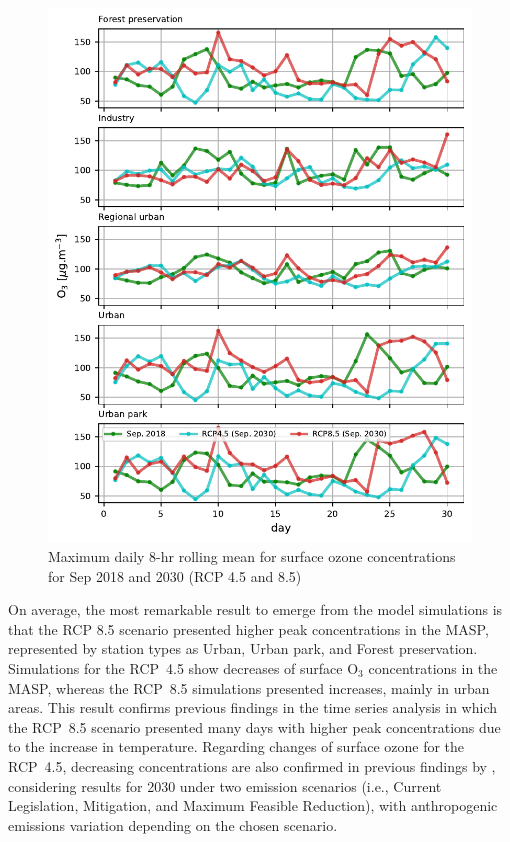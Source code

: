 \begin{figure}[!hbt]
\begin{center}
	\includegraphics{fig/MDA8_Sep_type_rcps}
\end{center}
  \caption{Maximum daily 8-hr rolling mean for surface ozone concentrations for Sep 2018 and 2030 (RCP 4.5 and 8.5)}
  \label{fig:MDA8_rcps}
\end{figure}

On average, the most remarkable result to emerge from the model simulations is that the RCP 8.5 scenario presented higher peak concentrations in the MASP, represented by station types as Urban, Urban park, and Forest preservation.
Simulations for the RCP~4.5 show decreases of surface O$_3$ concentrations in the MASP, whereas the RCP~8.5 simulations presented increases, mainly in urban areas.
This result confirms previous findings in the time series analysis in which the RCP~8.5 scenario presented many days with higher peak concentrations due to the increase in temperature.
Regarding changes of surface ozone for the RCP~4.5, decreasing concentrations are also confirmed in previous findings by \citet{Schuch2020}, considering results for 2030 under two emission scenarios (i.e., Current Legislation, Mitigation, and Maximum Feasible Reduction), with anthropogenic emissions variation depending on the chosen scenario.

